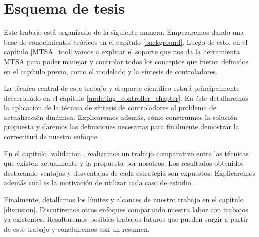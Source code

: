 \section{Esquema de tesis}

Este trabajo está organizado de la siguiente manera. Empezaremos dando una base de conocimientos teóricos en el capítulo
\ref{background}. Luego de esto, en el capítulo \ref{MTSA_tool} vamos a explicar el soporte que nos da la herramienta
MTSA para poder manejar y controlar todos los conceptos que fueron definidos en el capítulo previo, como el modelado y
la síntesis de controladores.

La técnica central de este trabajo y el aporte científico estará principalmente desarrollado en el capítulo
\ref{updating_controller_chapter}. En éste detallaremos la aplicación de la técnica de síntesis de controladores al
problema de actualización dinámica. Explicaremos además, cómo construimos la solución propuesta y daremos las
definiciones necesarias para finalmente demostrar la correctitud de nuestro enfoque.

En el capítulo \ref{validation}, realizamos un trabajo comparativo entre las técnicas que existen actualmente y la propuesta por
nosotros. Los resultados obtenidos destacando ventajas y desventajas de cada estrategia son expuestos. Explicaremos
además cual es la motivación de utilizar cada caso de estudio.

Finalmente, detallamos los límites y alcances de nuestro trabajo en el capítulo \ref{discusion}. Discutiremos otros
enfoques comparando nuestra labor con trabajos ya existentes. Resaltaremos posibles trabajos futuros que pueden surgir a
partir de este trabajo y concluiremos con un resumen.
